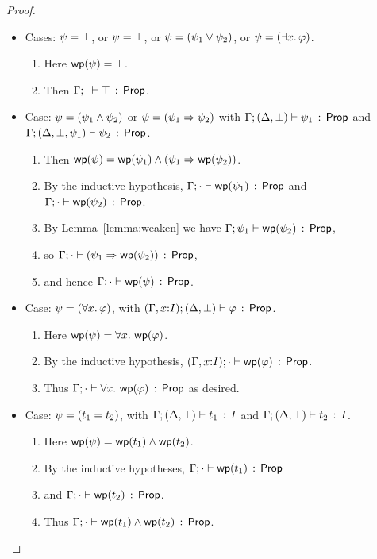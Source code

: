 \documentclass[10pt,a4paper]{article}
\begin{document}
\begin{proof}
\begin{itemize}
  \item Cases: $\psi = \top$, or $\psi = \bot$, or $\psi=(\psi_1 \vee \psi_2)$,
      or $\psi=(\exists x.\, \varphi)$.
      \begin{enumerate}
      \item 
      	Here $\mathop{\mathsf{wp}}(\psi) = \top$.
      \item
        Then $\Gamma;\cdot \vdash \top\, :\, \mathsf{Prop}$.
      \end{enumerate}
            
  \item Case: $\psi = (\psi_1 \wedge \psi_2)$ or $\psi = (\psi_1 \Rightarrow \psi_2)$ with
       $\Gamma;(\Delta,\bot) \vdash \psi_1\, :\, \mathsf{Prop}$ and 
              $\Gamma;(\Delta,\bot,\psi_1) \vdash \psi_2\, :\, \mathsf{Prop}$.
       \begin{enumerate}
       \item 
       		Then $\mathop{\mathsf{wp}}(\psi) = \mathop{\mathsf{wp}}(\psi_1) \wedge (\psi_1 \Rightarrow \mathop{\mathsf{wp}}(\psi_2))$.
       \item 
       		By the inductive hypothesis,
         	$\Gamma;\cdot \vdash \mathop{\mathsf{wp}}(\psi_1)\, :\, \mathsf{Prop}$
         	and $\Gamma;\cdot \vdash \mathop{\mathsf{wp}}(\psi_2)\, :\, \mathsf{Prop}$.
       \item 
       		By Lemma~\ref{lemma:weaken} we have 
			$\Gamma;\psi_1 \vdash \mathop{\mathsf{wp}}(\psi_2)\, :\, \mathsf{Prop}$,
		\item
			so $\Gamma;\cdot \vdash (\psi_1 \Rightarrow \mathop{\mathsf{wp}}(\psi_2))\, :\, \mathsf{Prop}$,
		\item
		 	and hence $\Gamma;\cdot \vdash \mathop{\mathsf{wp}}(\psi)\, :\, \mathsf{Prop}$.
       \end{enumerate}
  \item Case: $\psi=(\forall x.\, \varphi)$, 
        with $(\Gamma,x{:}I);(\Delta,\bot) \vdash \varphi\, :\, \mathsf{Prop}$.
  	\begin{enumerate}
	\item 
		Here $\mathop{\mathsf{wp}}(\psi) = \forall x.\, \mathop{\mathsf{wp}}(\varphi)$.
	\item 
		By the inductive hypothesis,
	   $(\Gamma,x{:}I);\cdot \vdash \mathop{\mathsf{wp}}(\varphi)\, :\, \mathsf{Prop}$.
	\item 
		Thus
	   $\Gamma;\cdot \vdash \forall x.\, \mathop{\mathsf{wp}}(\varphi)\, :\, \mathsf{Prop}$ as desired.
	\end{enumerate}
  \item Case: $\psi = (t_1 = t_2)$, with $\Gamma;(\Delta,\bot) \vdash t_1\, :\, I$ and $\Gamma;(\Delta,\bot) \vdash t_2\, :\, I$. 
    	\begin{enumerate}
	\item 
		Here $\mathop{\mathsf{wp}}(\psi) = \mathop{\mathsf{wp}}(t_1) \wedge \mathop{\mathsf{wp}}(t_2)$.
	\item 
		By the inductive hypotheses,
		$\Gamma;\cdot \vdash \mathop{\mathsf{wp}}(t_1)\, :\, \mathsf{Prop}$ 
	\item 
		and $\Gamma;\cdot \vdash \mathop{\mathsf{wp}}(t_2)\, :\, \mathsf{Prop}$.
	\item
		Thus $\Gamma;\cdot \vdash \mathop{\mathsf{wp}}(t_1) \wedge \mathop{\mathsf{wp}}(t_2)\, :\, \mathsf{Prop}$.
	\end{enumerate}
  \end{itemize}
\end{proof}
\end{document}
